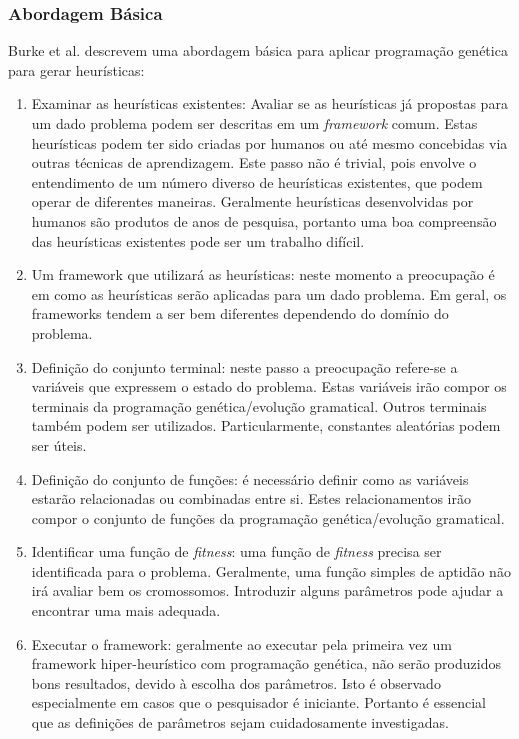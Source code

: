 \subsubsection{Abordagem Básica}

Burke et al. \cite{burke2009exploring} descrevem uma abordagem básica para aplicar programação genética para gerar heurísticas:

\begin{enumerate}
	\item Examinar as heurísticas existentes: Avaliar se as heurísticas já propostas para um dado problema podem ser descritas em um \textit{framework} comum. Estas heurísticas podem ter sido criadas por humanos ou até mesmo concebidas via outras técnicas de aprendizagem. Este passo não é trivial, pois envolve o entendimento de um número diverso de heurísticas existentes, que podem operar de diferentes maneiras. Geralmente heurísticas desenvolvidas por humanos são produtos de anos de pesquisa, portanto uma boa compreensão das heurísticas existentes pode ser um trabalho difícil. 
	\item Um framework que utilizará as heurísticas: neste momento a preocupação é em como as heurísticas serão aplicadas para um dado problema. Em geral, os frameworks tendem a ser bem diferentes dependendo do domínio do problema. 
	\item Definição do conjunto terminal: neste passo a preocupação refere-se a variáveis que expressem o estado do problema. Estas variáveis irão compor os terminais da programação genética/evolução gramatical. Outros terminais também podem ser utilizados. Particularmente, constantes aleatórias podem ser úteis.
	\item Definição do conjunto de funções: é necessário definir como as variáveis estarão relacionadas ou combinadas entre si. Estes relacionamentos irão compor o conjunto de funções da programação genética/evolução gramatical. 
	\item Identificar uma função de \textit{fitness}: uma função de \textit{fitness} precisa ser identificada para o problema. Geralmente, uma função simples de aptidão não irá avaliar bem os cromossomos. Introduzir alguns parâmetros pode ajudar a encontrar uma mais adequada.
	\item Executar o framework: geralmente ao executar pela primeira vez um framework hiper-heurístico com programação genética, não serão produzidos bons resultados, devido à escolha dos parâmetros. Isto é observado especialmente em casos que o pesquisador é iniciante. Portanto é essencial que as definições de parâmetros sejam cuidadosamente investigadas.
\end{enumerate}




